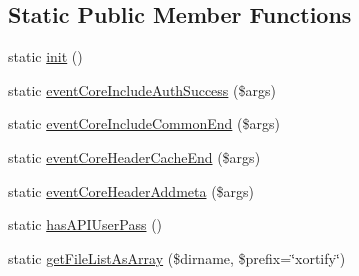 \subsection*{Static Public Member Functions}
\begin{DoxyCompactItemize}
\item 
static \hyperlink{class_xortify_core_preload_a9f0be6ae273d3669e11c29910a0be338}{init} ()
\item 
static \hyperlink{class_xortify_core_preload_a0ac5c4ae5ca172fc4ba58f576c215186}{event\-Core\-Include\-Auth\-Success} (\$args)
\item 
static \hyperlink{class_xortify_core_preload_a5cb12f8c8b7ab32f89c01204bdc7dda9}{event\-Core\-Include\-Common\-End} (\$args)
\item 
static \hyperlink{class_xortify_core_preload_ab40d1b1df5c1bbe50a8b662ccdca179b}{event\-Core\-Header\-Cache\-End} (\$args)
\item 
static \hyperlink{class_xortify_core_preload_ad87d8eb3de0b5e76826affb376348ed8}{event\-Core\-Header\-Addmeta} (\$args)
\item 
static \hyperlink{class_xortify_core_preload_a87a684f242cb74d15cef3f0105e25776}{has\-A\-P\-I\-User\-Pass} ()
\item 
static \hyperlink{class_xortify_core_preload_a04f25a3d87f0ec4c02b11858680c86db}{get\-File\-List\-As\-Array} (\$dirname, \$prefix=\char`\"{}xortify\char`\"{})
\end{DoxyCompactItemize}


